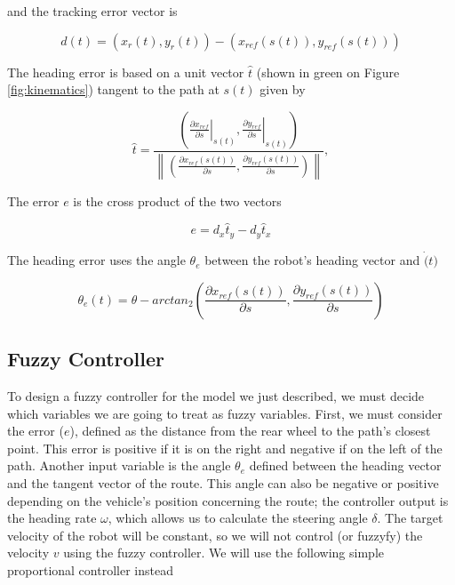 \documentclass[symmetry,article,submit,moreauthors,pdftex]{Definitions/mdpi}
\begin{document}
and the tracking error vector is 

\begin{equation}\label{eq:tracking_error}
d(t) = (x_r(t),y_r(t))-(x_{ref}(s(t)),y_{ref}(s(t)))
\end{equation}

The heading error is based on a unit vector $\hat{t}$ (shown in green on Figure
\ref{fig:kinematics}) tangent to the path at $s(t)$ given by 

\begin{equation}
\hat{t} = \frac{ \left(\left.\frac{\partial x_{ref}}{\partial s} \right|_{s(t)},\left.\frac{\partial y_{ref}}{\partial s} \right|_{s(t)}\right)} 
              {\left\| \left(\frac{\partial x_{ref}(s(t))}{\partial s},\frac{\partial y_{ref}(s(t))}{\partial s}\right) \right\|},
\end{equation}

The error $e$ is the cross product of the two vectors

\begin{equation}
e = d_x \hat{t}_y - d_y \hat{t}_x
\end{equation}

The heading error uses the angle $\theta_e$ between the robot's heading vector
and $\dot(t)$

\begin{equation}
\theta_e(t) = \theta - arctan_2 \left( \frac{\partial x_{ref}(s(t))}{\partial s} , \frac{\partial y_{ref}(s(t))}{\partial s} \right)
\end{equation}





\subsection{Fuzzy Controller}%
    \label{sub:FuzzyControllers}

To design a fuzzy controller for the model we just described, we must decide which 
variables we are going to treat as fuzzy variables. 
First, we must consider the error ($e$), defined as the distance from the rear wheel to the
path's closest point. This error is positive if it is on the right and
negative if on the left of the path. Another input variable is the angle
$\theta_e$ defined between the heading vector and the tangent vector of the
route. This angle can also be negative or positive depending on the vehicle's
position concerning the route; the controller output is the heading rate
$\omega$, which allows us to calculate the steering angle $\delta$. The target
velocity of the robot will be constant, so we will not control (or fuzzyfy) the
velocity $v$ using the fuzzy controller. We will use the following simple
proportional controller instead
\end{document}
